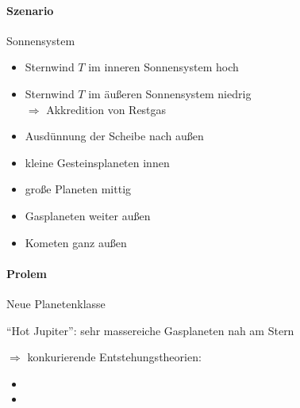 \paragraph{Szenario} Sonnensystem
\begin{itemize}
    \item Sternwind $T$ im inneren Sonnensystem hoch
    \item Sternwind $T$ im äußeren Sonnensystem niedrig \\
        $\Rightarrow$ Akkredition von Restgas
    \item Ausdünnung der Scheibe nach außen
    \item kleine Gesteinsplaneten innen
    \item große Planeten mittig
    \item Gasplaneten weiter außen
    \item Kometen ganz außen
\end{itemize}

\paragraph{Prolem} Neue Planetenklasse

``Hot Jupiter'': sehr massereiche Gasplaneten nah am Stern

$\Rightarrow$ konkurierende Entstehungstheorien:
\begin{itemize}
    \item {}
    \item {}
\end{itemize}
